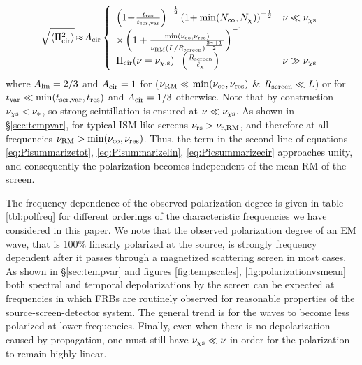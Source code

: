 \documentclass[fleqn,usenatbib]{mnras}
\begin{document}
	\begin{equation}
		\label{eq:Picsummarizecir}
		\sqrt{\langle \Pi_{\rm cir}^2\rangle}\!\approx\! A_{\rm cir} \left\{ \begin{array}{ll} \left(1\!+\!\frac{t_{\rm res}}{t_{\rm scr,var}}\right)^{-{1\over 2}} \left(1\!+\min(N_{\rm co},N_{\chi})\right)^{-{1\over 2}} & \nu\ll \nu_{\rm \chi s}\\ \times \left(1+\frac{\min(\nu_{\rm co},\nu_{\rm res})}{\nu_{\rm RM} (L/R_{\rm screen})^{2\gamma+1\over 2}}\right)^{-1} \\  \Pi_{\rm cir}(\nu=\nu_{\chi,\rm s}) \cdot\left(\frac{R_{\rm screen}}{\ell_{\chi}}\right) & \nu\gg \nu_{\chi\rm s}
		\end{array} \right. 
	\end{equation}
	where $A_{\rm lin}=2/3$ and $A_{\rm cir}=1$ for ($\nu_{\rm RM}\ll \min(\nu_{\rm co},\nu_{\rm res})$ \& $R_{\rm screen}\ll L$) or for $t_{\rm var}\ll \min(t_{\rm scr,var},t_{\rm res})$ and $A_{\rm cir}=1/3$ otherwise.
	Note that by construction $\nu_{\rm \chi s}<\nu_*$, so strong scintillation is ensured at $\nu\ll \nu_{\rm \chi s}$. As shown in \S \ref{sec:tempvar}, for typical ISM-like screens $\nu_{\rm rs}>\nu_{\rm r,RM}$, and therefore at all frequencies $\nu_{\rm RM}>\min(\nu_{\rm co},\nu_{\rm res})$. Thus, the term in the second line of equations \ref{eq:Pisummarizetot}, \ref{eq:Pisummarizelin}, \ref{eq:Picsummarizecir} approaches unity, and consequently the polarization becomes independent of the mean RM of the screen.
	
	The frequency dependence of the observed polarization degree is given in table \ref{tbl:polfreq} for different orderings of the characteristic frequencies we have considered in this paper. We note that the observed polarization degree of an EM wave, that is 100\% linearly polarized at the source, is strongly frequency dependent after it passes through a magnetized scattering screen in most cases.
	As shown in \S \ref{sec:tempvar} and figures \ref{fig:tempscales}, \ref{fig:polarizationvsmean} both spectral and temporal depolarizations by the screen can be expected at frequencies in which FRBs are routinely observed for reasonable properties of the source-screen-detector system. The general trend is for the waves to become less polarized at lower frequencies. Finally, even when there is no depolarization caused by propagation, one must still have $\nu_{\chi \rm s}\ll\nu$ in order for the polarization to remain highly linear.
	
	
	
\end{document}
